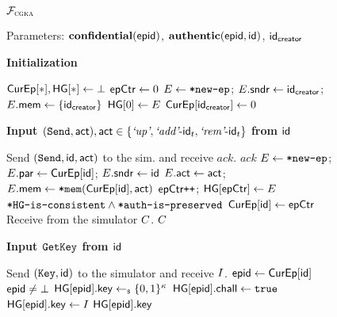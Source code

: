 
\begin{figure*}[!tbp]
\begin{systembox}{\normalsize$\mathcal{F}_{\normalfont\textsc{cgka}}$}
  \begin{flushleft}
    Parameters: $\KwConf{}(\hgnodeid)$, $\textnormal{\textbf{authentic}}{}({\normalfont\textsf{epid}}, {\mathsf{id}})$, ${\mathsf{id}}_\mathsf{creator}$

    \hrulefill
  \end{flushleft}

  {\begin{minipage}[t]{0.47\linewidth}
    \vspace*{-1em}
    {\bf Initialization} 
    \begin{algorithmic}
      \State $\textsf{CurEp}[*], \mathsf{HG}[*] \gets \bot$
	    \State $\textsf{epCtr} \gets 0$
      \State $E \gets {\ensuremath{\textnormal{\tt*new-ep}}}$; $E.\mathsf{sndr} \gets {\ensuremath{\mathsf{id}}}_\mathsf{creator}$; $E.\mathsf{mem} \gets \{{\mathsf{id}}_\mathsf{creator}\}$
      \State $\mathsf{HG}[0] \gets E$
      \State $\textsf{CurEp}[{\mathsf{id}}_\mathsf{creator}] \gets 0$
    \end{algorithmic}

    \medskip
    {\bf Input $({\normalfont\texttt{Send}}, \mathsf{act}), \mathsf{act} \in \{{\text{\normalfont \it`up'}} , {\text{\normalfont \it`add'}}\textrm{-}{\ensuremath{\mathsf{id}}}_t, {\text{\normalfont \it`rem'}}\textrm{-}{\ensuremath{\mathsf{id}}}_t\}$ from ${\mathsf{id}}$}
    \begin{algorithmic}
      \State {}
      \State Send $({\normalfont\texttt{Send}},{\mathsf{id}},\mathsf{act})$ to the sim. and receive $\mathit{ack}$.
      \State\KwReq{} $\mathit{ack}$
      \State {}
      \State $E \gets {\ensuremath{\textnormal{\tt*new-ep}}}$; $E.\mathsf{par} \gets \textsf{CurEp}[{\mathsf{id}}]$; $E.\mathsf{sndr} \gets {\ensuremath{\mathsf{id}}}$
      \State $E.\mathsf{act} \gets \mathsf{act}$; $E.\mathsf{mem} \gets {\ensuremath{\textnormal{\tt*mem}}}(\textsf{CurEp}[{\mathsf{id}}],\mathsf{act})$
      \State $\textsf{epCtr}\texttt{++}$; $\mathsf{HG}[\textsf{epCtr}]\gets E$
      \State {}
      \State \KwAss{} ${\textnormal{\tt*HG-is-consistent}} \land {\ensuremath{\textnormal{\tt*auth-is-preserved}}}$
      \State {}
      \State $\textsf{CurEp}[{\mathsf{id}}] \gets \textsf{epCtr}$
      \State {}
      \State Receive from the simulator $C$.
      \State \Return $C$		%
    \end{algorithmic}

    \medskip
    {\bf Input ${\normalfont\texttt{GetKey}}$ from ${\mathsf{id}}$}
    \begin{algorithmic}
      \State Send $({\normalfont\texttt{Key}},{\mathsf{id}})$ to the simulator and receive ${I}$.
      \State ${\normalfont\textsf{epid}} \gets \textsf{CurEp}[{\mathsf{id}}]$
      \State \KwReq{} ${\normalfont\textsf{epid}} \neq \bot$
        \If{$\KwConf{}(\hgnodeid)$}
          \State $\mathsf{HG}[{\normalfont\textsf{epid}}].\mathsf{key} \gets_{\scriptscriptstyle\$} \{0,1\}^\kappa$
          \State $\mathsf{HG}[{\normalfont\textsf{epid}}].\mathsf{chall} \gets {\normalfont\texttt{true}}$
        \Else
          \State $\mathsf{HG}[{\normalfont\textsf{epid}}].\mathsf{key} \gets {\ensuremath{I}}$
        \EndIf
      \EndIf
      \State \Return $\mathsf{HG}[{\normalfont\textsf{epid}}].\mathsf{key}$
    \end{algorithmic}


\end{minipage}}
\end{systembox}
\end{figure*}
